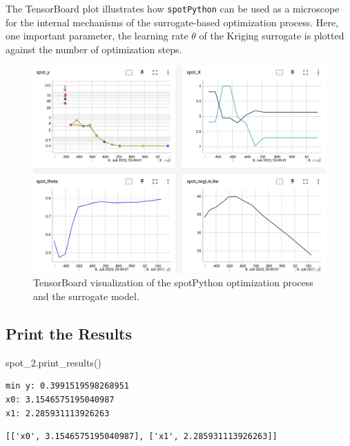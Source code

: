 \documentclass[
  letterpaper,
  DIV=11,
  numbers=noendperiod]{scrreprt}
\newenvironment{Shaded}{\begin{snugshade}}{\end{snugshade}}
\newcommand{\NormalTok}[1]{\textcolor[rgb]{0.00,0.23,0.31}{#1}}
\begin{document}
The TensorBoard plot illustrates how \texttt{spotPython} can be used as
a microscope for the internal mechanisms of the surrogate-based
optimization process. Here, one important parameter, the learning rate
\(\theta\) of the Kriging surrogate is plotted against the number of
optimization steps.

\begin{figure}[H]

{\centering \includegraphics[width=1\textwidth,height=\textheight]{figures_static/04_tensorboard_01.png}

}

\caption{TensorBoard visualization of the spotPython optimization
process and the surrogate model.}

\end{figure}%

\subsection{Print the Results}\label{print-the-results-2}

\begin{Shaded}
\begin{Highlighting}[]
\NormalTok{spot\_2.print\_results()}
\end{Highlighting}
\end{Shaded}

\begin{verbatim}
min y: 0.3991519598268951
x0: 3.1546575195040987
x1: 2.285931113926263
\end{verbatim}

\begin{verbatim}
[['x0', 3.1546575195040987], ['x1', 2.285931113926263]]
\end{verbatim}
\end{document}
